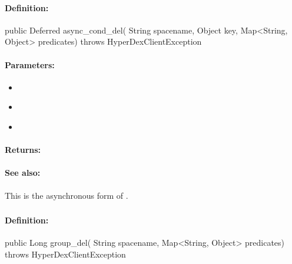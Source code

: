 \paragraph{Definition:}
\begin{javacode}
public Deferred async_cond_del(
        String spacename,
        Object key,
        Map<String, Object> predicates) throws HyperDexClientException
\end{javacode}

\paragraph{Parameters:}
\begin{itemize}[noitemsep]
\item {}\\

\item {}\\

\item {}\\

\end{itemize}

\paragraph{Returns:}


\paragraph{See also:}  This is the asynchronous form of .

\pagebreak
\subsubsection{}
\label{api:java:group_del}


\paragraph{Definition:}
\begin{javacode}
public Long group_del(
        String spacename,
        Map<String, Object> predicates) throws HyperDexClientException
\end{javacode}

